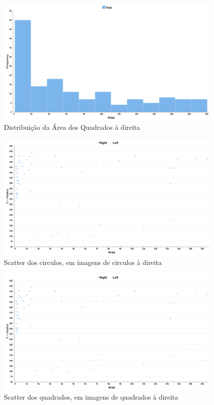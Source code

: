 \begin{figure}[H]
    \centering
    \includegraphics[width=\textwidth]{imgs/Test_7/7_2/failed/sar_sq_failed_area_hist.png}
    \caption{Distribuição da Área dos Quadrados à direita }
    \label{fig:sub2}
\end{figure}

\begin{figure}[H]
    \centering
    \includegraphics[width=\textwidth]{imgs/Test_7/7_2/failed/car_ci_failed_right_left_scatter.png}
    \caption{Scatter dos circulos, em imagens de circulos à direita}
    \label{fig:sub2}
\end{figure}

\begin{figure}[H]
    \centering
    \includegraphics[width=\textwidth]{imgs/Test_7/7_2/failed/car_ci_failed_right_left_scatter.png}
    \caption{Scatter dos quadrados, em imagens de quadrados à direita}
    \label{fig:sub2}
\end{figure}

